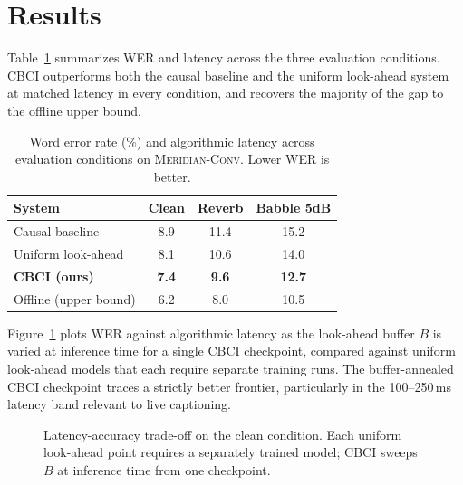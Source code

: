 \section{Results}
Table~\ref{tab:main-results} summarizes WER and latency across the three evaluation conditions. CBCI
outperforms both the causal baseline and the uniform look-ahead system at matched latency in every
condition, and recovers the majority of the gap to the offline upper bound.

\begin{table}[t]
\centering
\caption{Word error rate (\%) and algorithmic latency across evaluation conditions on \textsc{Meridian-Conv}. Lower WER is better.}
\label{tab:main-results}
\footnotesize
\begin{tabular}{@{}lccc@{}}
\toprule
\textbf{System} & \textbf{Clean} & \textbf{Reverb} & \textbf{Babble 5dB} \\
\midrule
Causal baseline        & 8.9  & 11.4 & 15.2 \\
Uniform look-ahead      & 8.1  & 10.6 & 14.0 \\
\textbf{CBCI (ours)}    & \textbf{7.4} & \textbf{9.6}  & \textbf{12.7} \\
\midrule
Offline (upper bound)  & 6.2  & 8.0  & 10.5 \\
\bottomrule
\end{tabular}
\end{table}

Figure~\ref{fig:latency-tradeoff} plots WER against algorithmic latency as the look-ahead buffer $B$ is
varied at inference time for a single CBCI checkpoint, compared against uniform look-ahead models that
each require separate training runs. The buffer-annealed CBCI checkpoint traces a strictly better
frontier, particularly in the 100--250\,ms latency band relevant to live captioning.

\begin{figure}[t]
\centering
{}
\caption{Latency-accuracy trade-off on the clean condition. Each uniform look-ahead point requires a
separately trained model; CBCI sweeps $B$ at inference time from one checkpoint.}
\label{fig:latency-tradeoff}
\end{figure}

